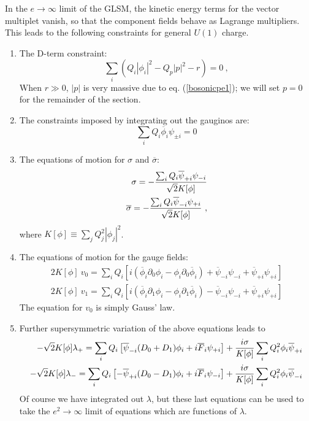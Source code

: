 \documentclass[a4paper,12pt]{article}
\begin{document}
In the $e\rightarrow\infty$ limit of the GLSM,
the kinetic energy terms for the vector
multiplet vanish, so that the component fields behave as Lagrange multipliers.
This leads to the following constraints for general $U(1)$ charge.
\begin{enumerate}
\item The D-term constraint:
\begin{equation}
\sum_i (Q_i |\phi_i|^2 - Q_p |p|^2 - r )=0\ ,
\label{condition}
\end{equation}
When $r\gg 0$, $|p|$ is very massive due to 
eq. (\ref{bosonicpe1});
we will set $p = 0$ for the remainder of the section.
\item The constraints imposed by integrating out the
gauginos are:
\begin{equation}
\sum_i Q_i\overline{\phi}_i \psi_{\pm i} =0
\label{lambconstr}
\end{equation}
\item The equations of motion for $\sigma$ and 
$\overline{\sigma}$:
\begin{eqnarray}
\sigma = -{{\sum_i Q_i \overline{\psi}_{+i}\psi_{-i}}\over{\sqrt2
K[\phi]}} 
\label{sigconstr} \\
\overline{\sigma} = -{{\sum_i Q_i \overline{\psi}_{-i}\psi_{+i}}\over
{\sqrt2 K[\phi]}} \label{sigbconstr}\ ,
\end{eqnarray}
where $K[\phi]\equiv\sum_j Q_j^2 |\phi_j|^2$.
\item The equations of motion for the gauge fields:
\begin{eqnarray}
2 K[\phi]\ v_0 = \sum_i Q_i \left[ 
i (\overline{\phi}_i\partial_0 \phi_i - \phi_i \partial_0
\overline{\phi}_i) +
\overline{\psi}_{-i} \psi_{-i} + \overline{\psi}_{+i} \psi_{+i} \right]
\label{gauss}
\\
2 K[\phi]\ v_1 = \sum_i Q_i \left[ 
i (\overline{\phi}_i\partial_1 \phi_i - \phi_i \partial_1
\overline{\phi}_i) -
\overline{\psi}_{-i} \psi_{-i} + \overline{\psi}_{+i} \psi_{+i} \right]
\label{gaussb}
\end{eqnarray}
The equation for $v_0$ is simply Gauss' law.
\item Further supersymmetric variation of the above equations
leads to 
\begin{eqnarray}
-\sqrt2 K[\phi] \lambda_+ = \sum_i Q_i \left[ \overline{\psi}_{-i} 
	(D_0 +D_1) \phi_i +i \overline{F}_i \psi_{+i}\right] 
+ {i\sigma\over{K[\phi]}} 
\sum_i Q_i^2 \phi_i \overline{\psi}_{+i}\nonumber \\
-\sqrt2 K[\phi] \lambda_- = \sum_i 
	Q_i \left[ - \overline{\psi}_{+i} (D_0
-D_1) \phi_i +i \overline{F}_i \psi_{-i}\right] 
+ {i\sigma\over{K[\phi]}} 
\sum_i Q_i^2 \phi_i \overline{\psi}_{-i} 
\label{lamminsol}
\end{eqnarray}
Of course we have integrated out $\lambda$, but these
last equations can be used to take the $e^2 \rightarrow\infty$
limit of equations which are functions of $\lambda$.
\end{enumerate}
\end{document}

